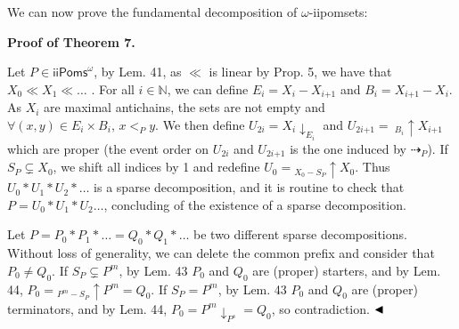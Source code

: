 \documentclass[10pt,a4paper]{article}
\begin{document}
 
 
We can now prove the fundamental decomposition of $\omega$-iipomsets:\par
 
 
 

 
\par\medskip\noindent\textbf{Proof of Theorem 7.}\par
 
 
Let $P\in{\mathsf{iiPoms}^{\omega}}$, by Lem. 41, as $\ll$ is linear by Prop. 5, we have that $X_{0}\ll X_{1}\ll\dots$ . For all $i\in\mathbb{N}$, we can define $E_{i}=X_{i}-X_{i\text{+}1}$ and $B_{i}=X_{i\text{+}1}-X_{i}$. As $X_{i}$ are maximal antichains, the sets are not empty and $\forall(x,y)\in E_{i}\times B_{i},\,x<_{P}y$. We then define $U_{2i}={X_{i}}{\downarrow}_{E_{i}}$ and $U_{2i\text{+}1}=\ {}_{B_{i}\!}{\uparrow}{X_{i\text{+}1}}$ which are proper (the event order on $U_{2i}$ and $U_{2i\text{+}1}$ is the one induced by $\dashrightarrow_{P}$). If $S_{P}\subsetneq X_{0}$, we shift all indices by 1 and redefine $U_{0}={}_{X_{0}-S_{P}\!}{\uparrow}{X_{0}}$. Thus $U_{0}*U_{1}*U_{2}*\dots$ is a sparse decomposition, and it is routine to check that $P=U_{0}*U_{1}*U_{2}\dots$, concluding of the existence of a sparse decomposition.\par
 
 
 
Let $P=P_{0}*P_{1}*\dots=Q_{0}*Q_{1}*\dots$ be two different sparse decompositions. Without loss of generality, we can delete the common prefix and consider that $P_{0}\neq Q_{0}$. If $S_{P}\subsetneq P^{m}$, by Lem. 43 $P_{0}$ and $Q_{0}$ are (proper) starters, and by Lem. 44, $P_{0}={}_{P^{m}-S_{P}\!}{\uparrow}{P^{m}}=Q_{0}$. If $S_{P}=P^{m}$, by Lem. 43 $P_{0}$ and $Q_{0}$ are (proper) terminators, and by Lem. 44, $P_{0}={P^{m}}{\downarrow}_{P^{s}}=Q_{0}$, so contradiction. $\hfill\blacktriangleleft$\par
 
 

 
 
\end{document}
